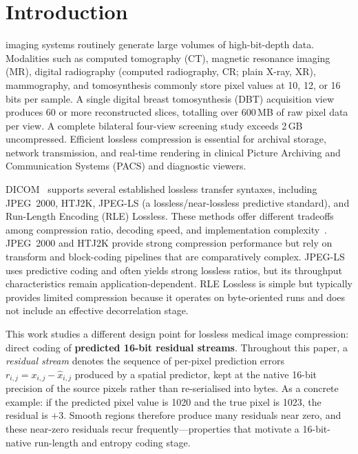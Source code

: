 \documentclass[journal]{IEEEtran}
\begin{document}
\section{Introduction}
\label{sec:intro}

 imaging systems routinely generate large volumes of
high-bit-depth data. Modalities such as computed tomography (CT), magnetic
resonance imaging (MR), digital radiography (computed radiography,
CR; plain X-ray, XR), mammography, and tomosynthesis commonly store pixel
values at 10, 12, or 16 bits per sample. A single digital breast tomosynthesis
(DBT) acquisition view produces 60 or more reconstructed slices, totalling over
600\,MB of raw pixel data per view. A complete bilateral four-view screening
study exceeds 2\,GB uncompressed. Efficient lossless compression is essential
for archival storage, network transmission, and real-time rendering in clinical
Picture Archiving and Communication Systems (PACS) and diagnostic viewers.

DICOM~\cite{dicom} supports several established lossless transfer syntaxes,
including JPEG~2000, HTJ2K, JPEG-LS (a lossless/near-lossless predictive
standard), and Run-Length Encoding (RLE) Lossless. These methods offer
different tradeoffs among compression ratio, decoding speed, and
implementation complexity~\cite{liu2017,clunie2000}. JPEG~2000 and HTJ2K
provide strong compression performance but rely on transform and block-coding
pipelines that are comparatively complex. JPEG-LS uses predictive coding and
often yields strong lossless ratios, but its throughput characteristics remain
application-dependent. RLE Lossless is simple but typically provides limited
compression because it operates on byte-oriented runs and does not include an
effective decorrelation stage.

This work studies a different design point for lossless medical image
compression: direct coding of \textbf{predicted 16-bit residual streams}.
Throughout this paper, a \emph{residual stream} denotes the sequence of
per-pixel prediction errors $r_{i,j} = x_{i,j} - \hat{x}_{i,j}$ produced by a
spatial predictor, kept at the native 16-bit precision of the source pixels
rather than re-serialised into bytes. As a concrete example: if the predicted
pixel value is 1020 and the true pixel is 1023, the residual is $+3$.
Smooth regions therefore produce many residuals near zero, and these near-zero
residuals recur frequently---properties that motivate a 16-bit-native
run-length and entropy coding stage.
\end{document}
